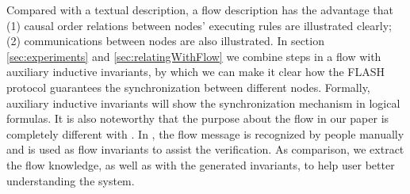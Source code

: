 \documentclass{llncs-new}
\newcommand{\lvyi}[1]{{\color{blue}#1}}
\begin{document}
Compared with a textual description, a flow description has the advantage that (1) causal order relations between nodes' executing rules are illustrated clearly; (2) communications between nodes are also illustrated. In section \ref{sec:experiments} and \ref{sec:relatingWithFlow} we combine steps in a flow with auxiliary inductive invariants, by which we can make it clear  how the FLASH protocol guarantees the synchronization between different nodes. Formally, auxiliary inductive invariants will show    the synchronization mechanism in logical formulas. It is also noteworthy that the purpose about the flow in our paper is completely different with \cite{Talupur2008a}. In \cite{Talupur2008a}, the flow message is recognized by people manually and is used as flow invariants to assist the verification. As comparison, we extract the flow knowledge, as well as with the generated invariants, to help user better understanding the system.






\end{document}
